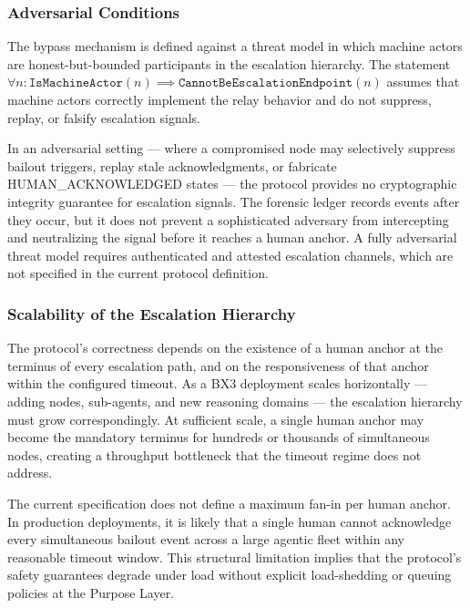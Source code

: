 \subsubsection{Adversarial Conditions}
\label{sec:lim_adversarial}

The bypass mechanism is defined against a threat model in which machine actors are honest-but-bounded participants in the escalation hierarchy. The statement $\forall n : \texttt{IsMachineActor}(n) \implies \texttt{CannotBeEscalationEndpoint}(n)$ assumes that machine actors correctly implement the relay behavior and do not suppress, replay, or falsify escalation signals.

In an adversarial setting — where a compromised node may selectively suppress bailout triggers, replay stale acknowledgments, or fabricate HUMAN\_ACKNOWLEDGED states — the protocol provides no cryptographic integrity guarantee for escalation signals. The forensic ledger records events after they occur, but it does not prevent a sophisticated adversary from intercepting and neutralizing the signal before it reaches a human anchor. A fully adversarial threat model requires authenticated and attested escalation channels, which are not specified in the current protocol definition.

\subsubsection{Scalability of the Escalation Hierarchy}
\label{sec:lim_scalability}

The protocol's correctness depends on the existence of a human anchor at the terminus of every escalation path, and on the responsiveness of that anchor within the configured timeout. As a BX3 deployment scales horizontally — adding nodes, sub-agents, and new reasoning domains — the escalation hierarchy must grow correspondingly. At sufficient scale, a single human anchor may become the mandatory terminus for hundreds or thousands of simultaneous nodes, creating a throughput bottleneck that the timeout regime does not address.

The current specification does not define a maximum fan-in per human anchor. In production deployments, it is likely that a single human cannot acknowledge every simultaneous bailout event across a large agentic fleet within any reasonable timeout window. This structural limitation implies that the protocol's safety guarantees degrade under load without explicit load-shedding or queuing policies at the Purpose Layer.

